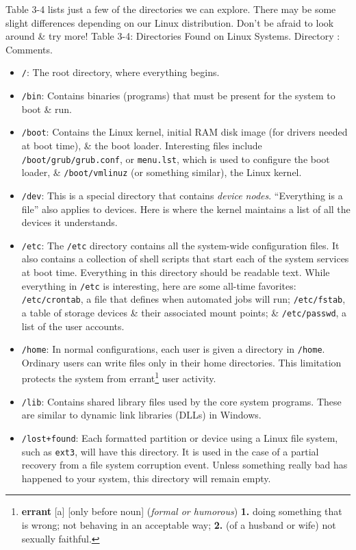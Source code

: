 \documentclass[oneside]{book}
\numberwithin{equation}{section}
\begin{document}
Table 3-4 lists just a few of the directories we can explore. There may be some slight differences depending on our Linux distribution. Don't be afraid to look around \& try more! \textsf{Table 3-4: Directories Found on Linux Systems. Directory : Comments.}
\begin{itemize}
	\item \texttt{/}: The root directory, where everything begins.
	\item \texttt{/bin}: Contains binaries (programs) that must be present for the system to boot \& run.
	\item \texttt{/boot}: Contains the Linux kernel, initial RAM disk image (for drivers needed at boot time), \& the boot loader. Interesting files include \texttt{/boot/grub/grub.conf}, or \texttt{menu.lst}, which is used to configure the boot loader, \& \texttt{/boot/vmlinuz} (or something similar), the Linux kernel.
	\item \texttt{/dev}: This is a special directory that contains \textit{device nodes}. ``Everything is a file'' also applies to devices. Here is where the kernel maintains a list of all the devices it understands.
	\item \texttt{/etc}: The \texttt{/etc} directory contains all the system-wide configuration files. It also contains a collection of shell scripts that start each of the system services at boot time. Everything in this directory should be readable text. While everything in \texttt{/etc} is interesting, here are some all-time favorites: \texttt{/etc/crontab}, a file that defines when automated jobs will run; \texttt{/etc/fstab}, a table of storage devices \& their associated mount points; \& \texttt{/etc/passwd}, a list of the user accounts.
	\item \texttt{/home}: In normal configurations, each user is given a directory in \texttt{/home}. Ordinary users can write files only in their home directories. This limitation protects the system from errant\footnote{\textbf{errant} [a] [only before noun] (\textit{formal or humorous}) \textbf{1.} doing something that is wrong; not behaving in an acceptable way; \textbf{2.} (of a husband or wife) not sexually faithful.} user activity.
	\item \texttt{/lib}: Contains shared library files used by the core system programs. These are similar to dynamic link libraries (DLLs) in Windows.
	\item \texttt{/lost+found}: Each formatted partition or device using a Linux file system, such as \texttt{ext3}, will have this directory. It is used in the case of a partial recovery from a file system corruption event. Unless something really bad has happened to your system, this directory will remain empty.

\end{itemize}
\end{document}

